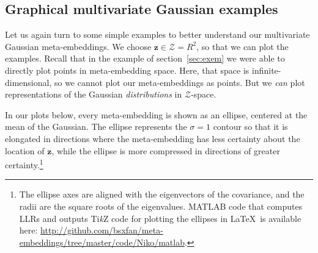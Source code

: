 \documentclass[a4paper,oneside,12pt,english]{report}
\def\zvec{\mathbf{z}}
\def\ND{\mathcal{N}}
\def\expv#1#2{\bigl\langle#1\bigr\rangle_{#2}}
\def\R{\mathbb{R}}
\def\Zset{\mathcal{Z}}
\def\Bmat{\mathbf{B}}
\def\avec{\mathbf{a}}
\def\Zset{\mathcal{Z}}
\def\dot#1#2{\expv{#1,#2}{}}
\def\normal#1{\overline{#1}}
\def\dotn#1#2{\dot{\normal{#1}}{\normal{#2}}}
\begin{document}
%

\subsection{Graphical multivariate Gaussian examples}
\label{sec:GME_examples}
Let us again turn to some simple examples to better understand our multivariate Gaussian meta-embeddings. We choose $\zvec\in\Zset=R^2$, so that we can plot the examples. Recall that in the example of section~\ref{sec:exem} we were able to directly plot points in meta-embedding space. Here, that space is infinite-dimensional, so we cannot plot our meta-embeddings as points. But we \emph{can} plot representations of the Gaussian \emph{distributions} in $\Zset$-space. 

In our plots below, every meta-embedding is shown as an ellipse, centered at the mean of the Gaussian. The ellipse represents the $\sigma=1$ contour so that it is elongated in directions where the meta-embedding has less certainty about the location of $\zvec$, while the ellipse is more compressed in directions of greater certainty.\footnote{The ellipse axes are aligned with the eigenvectors of the covariance, and the radii are the square roots of the eigenvalues. MATLAB code that computes LLRs and outputs Ti\emph{k}Z code for plotting the ellipses in \LaTeX~is available here: \url{http://github.com/bsxfan/meta-embeddings/tree/master/code/Niko/matlab}.}
\end{document}
